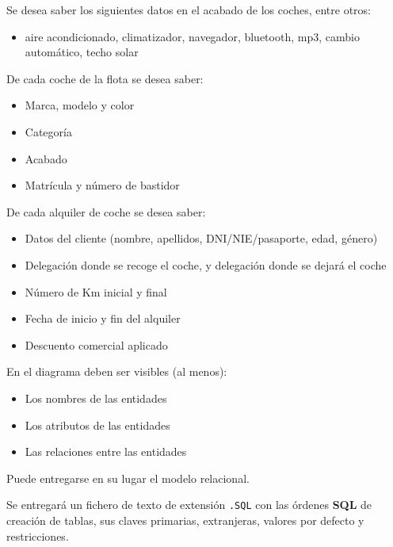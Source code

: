 Se desea saber los siguientes datos en el acabado de los coches, entre otros:
\begin{itemize}
\item aire acondicionado, climatizador, navegador, bluetooth, mp3, cambio automático, techo solar
\end{itemize}

De cada coche de la flota se desea saber:
\begin{itemize}
\item Marca, modelo y color
\item Categoría
\item Acabado
\item Matrícula y número de bastidor
\end{itemize}

De cada alquiler de coche se desea saber:
\begin{itemize}
\item Datos del cliente (nombre, apellidos, DNI/NIE/pasaporte, edad,
  género)
\item  Delegación donde se recoge el coche, y delegación donde se
  dejará el coche
\item  Número de Km inicial y final
\item  Fecha de inicio y fin del alquiler
\item  Descuento comercial aplicado
\end{itemize}


\begin{homeworkProblem}
  En el diagrama deben ser visibles (al menos):
  \begin{itemize}
  \item Los nombres de las entidades
  \item Los atributos de las entidades
  \item Las relaciones entre las entidades
  \end{itemize}

  Puede entregarse en su lugar el modelo relacional.
\end{homeworkProblem}


\begin{homeworkProblem}
  Se entregará un fichero de texto de extensión \texttt{.SQL} con las órdenes \textbf{SQL} de creación de tablas, sus claves primarias, extranjeras, valores por defecto y restricciones.

\end{homeworkProblem}



